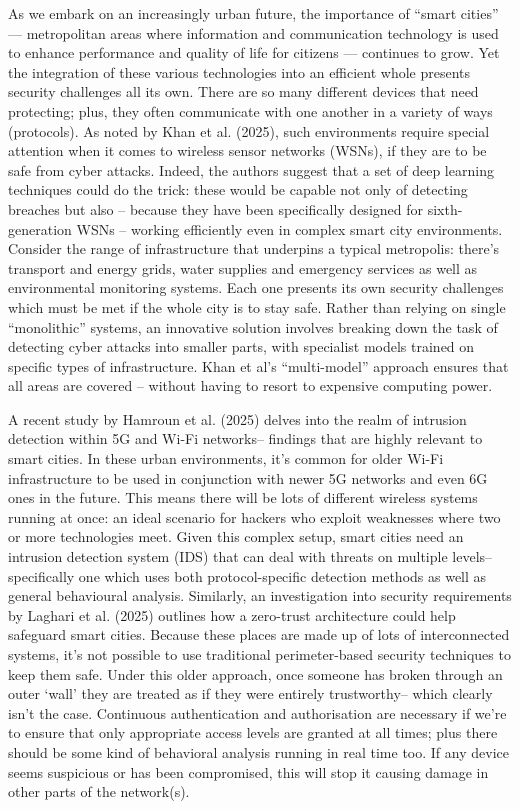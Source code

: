 \documentclass[12pt]{article}
\begin{document}
As we embark on an increasingly urban future, the importance of “smart cities” — metropolitan areas where information and communication technology is used to enhance performance and quality of life for citizens — continues to grow.
Yet the integration of these various technologies into an efficient whole presents security challenges all its own. There are so many different devices that need protecting; plus, they often communicate with one another in a variety of ways (protocols).
As noted by Khan et al. (2025), such environments require special attention when it comes to wireless sensor networks (WSNs), if they are to be safe from cyber attacks.
Indeed, the authors suggest that a set of deep learning techniques could do the trick: these would be capable not only of detecting breaches but also -- because they have been specifically designed for sixth-generation WSNs -- working efficiently even in complex smart city environments. Consider the range of infrastructure that underpins a typical metropolis: there's transport and energy grids, water supplies and emergency services as well as environmental monitoring systems. Each one presents its own security challenges which must be met if the whole city is to stay safe.
Rather than relying on single “monolithic” systems, an innovative solution involves breaking down the task of detecting cyber attacks into smaller parts, with specialist models trained on specific types of infrastructure.
Khan et al’s “multi-model” approach ensures that all areas are covered -- without having to resort to expensive computing power.

A recent study by Hamroun et al. (2025) delves into the realm of intrusion detection within 5G and Wi-Fi networks– findings that are highly relevant to smart cities. In these urban environments, it’s common for older Wi-Fi infrastructure to be used in conjunction with newer 5G networks and even 6G ones in the future. This means there will be lots of different wireless systems running at once: an ideal scenario for hackers who exploit weaknesses where two or more technologies meet. Given this complex setup, smart cities need an intrusion detection system (IDS) that can deal with threats on multiple levels– specifically one which uses both protocol-specific detection methods as well as general behavioural analysis. Similarly, an investigation into security requirements by Laghari et al. (2025) outlines how a zero-trust architecture could help safeguard smart cities. Because these places are made up of lots of interconnected systems, it’s not possible to use traditional perimeter-based security techniques to keep them safe. Under this older approach, once someone has broken through an outer ‘wall’ they are treated as if they were entirely trustworthy– which clearly isn’t the case. Continuous authentication and authorisation are necessary if we’re to ensure that only appropriate access levels are granted at all times; plus there should be some kind of behavioral analysis running in real time too. If any device seems suspicious or has been compromised, this will stop it causing damage in other parts of the network(s).
\end{document}
